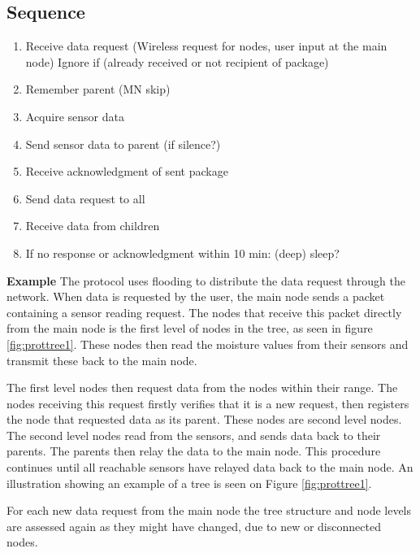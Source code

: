 \subsection{Sequence}
\begin{enumerate}
	\item Receive data request (Wireless request for nodes, user input at the main node)
		\subitem Ignore if (already received or not recipient of package)
	\item Remember parent (MN skip)
	\item Acquire sensor data
	\item Send sensor data to parent (if silence?)
	\item Receive acknowledgment of sent package
	\item Send data request to all
	\item Receive data from children
	\item If no response or acknowledgment within 10 min: (deep) sleep?
\end{enumerate}



\textbf{Example}\newline
The protocol uses flooding to distribute the data request through the network. 
When data is requested by the user, the main node sends a packet containing a sensor reading request. 
The nodes that receive this packet directly from the main node is the first level of nodes in the tree, as seen in figure \ref{fig:prottree1}. 
These nodes then read the moisture values from their sensors and transmit these back to the main node. 

The first level nodes then request data from the nodes within their range. 
The nodes receiving this request firstly verifies that it is a new request, then registers the node that requested data as its parent. 
These nodes are second level nodes. The second level nodes read from the sensors, and sends data back to their parents. The parents then relay the data to the main node. 
This procedure continues until all reachable sensors have relayed data back to the main node.
An illustration showing an example of a tree is seen on Figure \ref{fig:prottree1}.

For each new data request from the main node the tree structure and node levels are assessed again as they might have changed, due to new or disconnected nodes.

